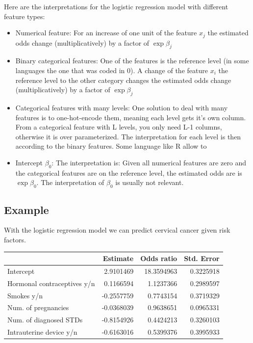 \documentclass[12pt,]{krantz}
\providecommand{\tightlist}{%
  \setlength{\itemsep}{0pt}\setlength{\parskip}{0pt}}
\theoremstyle{definition}
\theoremstyle{definition}
\theoremstyle{definition}
\theoremstyle{remark}
\begin{document}
Here are the interpretations for the logistic regression model with
different feature types:

\begin{itemize}
\tightlist
\item
  Numerical feature: For an increase of one unit of the feature
  \(x_{j}\) the estimated odds change (multiplicatively) by a factor of
  \(\exp{\beta_{j}}\)
\item
  Binary categorical features: One of the features is the reference
  level (in some languages the one that was coded in 0). A change of the
  feature \(x_{i}\) the reference level to the other category changes
  the estimated odds change (multiplicatively) by a factor of
  \(\exp{\beta_{j}}\)
\item
  Categorical features with many levels: One solution to deal with many
  features is to one-hot-encode them, meaning each level gets it's own
  column. From a categorical feature with L levels, you only need L-1
  columns, otherwise it is over parameterized. The interpretation for
  each level is then according to the binary features. Some language
  like R allow to
\item
  Intercept \(\beta_{0}\): The interpretation is: Given all numerical
  features are zero and the categorical features are on the reference
  level, the estimated odds are is \(\exp{\beta_{0}}\). The
  interpretation of \(\beta_{0}\) is usually not relevant.
\end{itemize}

\subsection{Example}\label{example}

With the logistic regression model we can predict cervical cancer given
risk factors.

\begin{tabular}{l|r|r|r}
\hline
  & Estimate & Odds ratio & Std. Error\\
\hline
Intercept & 2.9101469 & 18.3594963 & 0.3225918\\
\hline
Hormonal contraceptives y/n & 0.1166594 & 1.1237366 & 0.2989597\\
\hline
Smokes y/n & -0.2557759 & 0.7743154 & 0.3719329\\
\hline
Num. of pregnancies & -0.0368039 & 0.9638651 & 0.0965331\\
\hline
Num. of diagnosed STDs & -0.8154926 & 0.4424213 & 0.3260103\\
\hline
Intrauterine device y/n & -0.6163016 & 0.5399376 & 0.3995933\\
\hline
\end{tabular}
\end{document}
